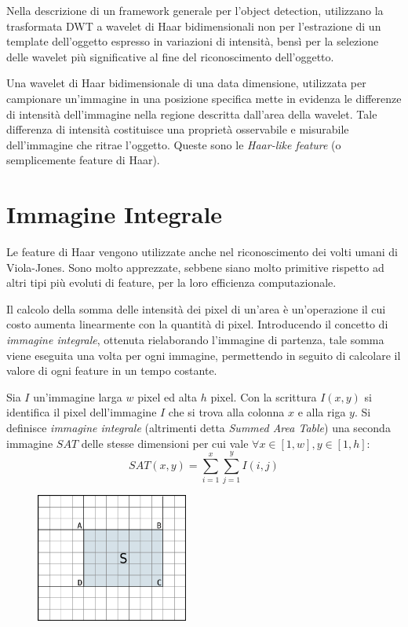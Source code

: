 Nella descrizione di un framework generale per l'object detection, \citet{Papageorgiou98} utilizzano la trasformata DWT a wavelet di Haar bidimensionali non per l'estrazione di un template dell'oggetto espresso in variazioni di intensità, bensì per la selezione delle wavelet più significative al fine del riconoscimento dell'oggetto.

Una wavelet di Haar bidimensionale di una data dimensione, utilizzata per campionare un'immagine in una posizione specifica mette in evidenza le differenze di intensità dell'immagine nella regione descritta dall'area della wavelet. Tale differenza di intensità costituisce una proprietà osservabile e misurabile dell'immagine che ritrae l'oggetto. Queste sono le \emph{Haar-like feature} (o semplicemente feature di Haar).

\section{Immagine Integrale}
\label{sec:integral_image}
Le feature di Haar vengono utilizzate anche nel riconoscimento dei volti umani di Viola-Jones.
Sono molto apprezzate, sebbene siano molto primitive rispetto ad altri tipi più evoluti di feature, per la loro efficienza computazionale.

Il calcolo della somma delle intensità dei pixel di un'area è un'operazione il cui costo aumenta linearmente con la quantità di pixel. Introducendo il concetto di \emph{immagine integrale}, ottenuta rielaborando l'immagine di partenza, tale somma viene eseguita una volta per ogni immagine, permettendo in seguito di calcolare il valore di ogni feature in un tempo costante.

\begin{definition}
    Sia $I$ un'immagine larga $w$ pixel ed alta $h$ pixel. Con la scrittura $I(x, y)$ si identifica il pixel dell'immagine $I$ che si trova alla colonna $x$ e alla riga $y$.
    Si definisce \emph{immagine integrale} (altrimenti detta \emph{Summed Area Table}) una seconda immagine $SAT$ delle stesse dimensioni per cui vale $\forall x \in [1,w], y \in [1,h]$:
    \begin{equation}
        SAT(x, y) = \sum_{i = 1}^{x} \sum_{j = 1}^{y} I(i, j)
    \end{equation}
\end{definition}

\begin{figure}
    \begin{center}
        \includegraphics[width=5cm]{img/integral_image_sum.png}
    \end{center}
    \caption{}
    \label{fig:integral_image_sum}
\end{figure}

